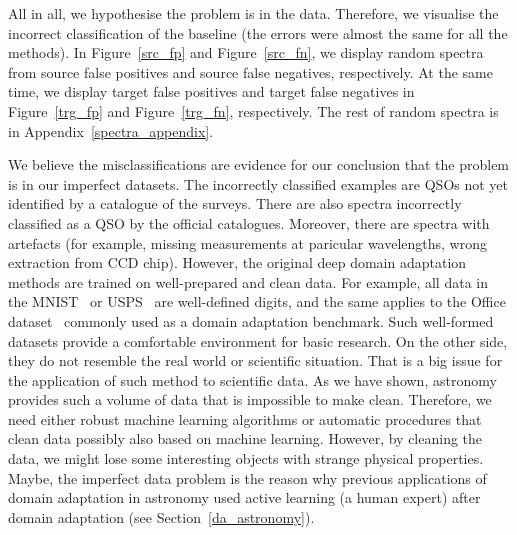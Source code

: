 All in all, we hypothesise the problem is in the data.
Therefore, we visualise the incorrect classification of the baseline
(the errors were almost the same for all the methods).
In Figure~\ref{src_fp} and Figure~\ref{src_fn},
we display random spectra from source false positives and source false negatives, respectively.
At the same time, we display target false positives and target false negatives in Figure~\ref{trg_fp} and Figure~\ref{trg_fn}, respectively.
The rest of random spectra is in Appendix~\ref{spectra_appendix}.

We believe the misclassifications are evidence for our conclusion
that the problem is in our imperfect datasets.
The incorrectly classified examples are QSOs not yet identified by a catalogue of the surveys.
There are also spectra incorrectly classified as a QSO by the official catalogues.
Moreover, there are spectra with artefacts
(for example, missing measurements at paricular wavelengths, wrong extraction from CCD chip). 
However, the original deep domain adaptation methods are trained on well-prepared and clean data.
For example, all data in the MNIST~\cite{lecun1998} or USPS~\cite{hull1994} are well-defined digits,
and the same applies to the Office dataset~\cite{saenko2010} commonly used as a domain adaptation benchmark.
Such well-formed datasets provide a comfortable environment for basic research.
On the other side, they do not resemble the real world or scientific situation.
That is a big issue for the application of such method to scientific data.
As we have shown, astronomy provides such a volume of data that is impossible to make clean.
Therefore, we need either robust machine learning algorithms
or automatic procedures that clean data possibly also based on machine learning.
However, by cleaning the data, we might lose some interesting objects with strange physical properties.
Maybe, the imperfect data problem is the reason
why previous applications of domain adaptation in astronomy used active learning (a human expert)
after domain adaptation (see Section~\ref{da_astronomy}).

